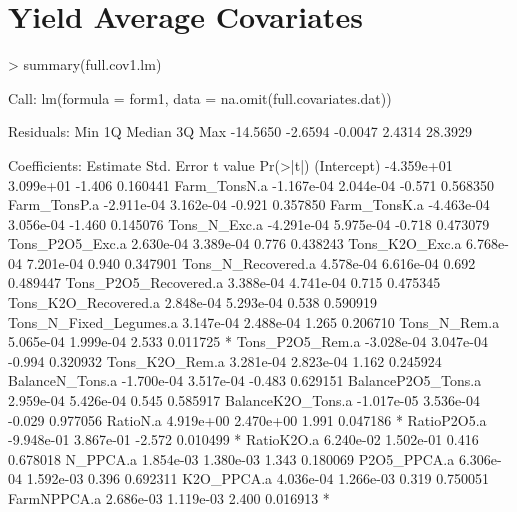 \documentclass{report}
\begin{document}
\section{Yield Average Covariates}
\begin{Schunk}
\begin{Sinput}
> summary(full.cov1.lm)
\end{Sinput}
\begin{Soutput}
Call:
lm(formula = form1, data = na.omit(full.covariates.dat))

Residuals:
     Min       1Q   Median       3Q      Max 
-14.5650  -2.6594  -0.0047   2.4314  28.3929 

Coefficients:
                                   Estimate Std. Error t value Pr(>|t|)    
(Intercept)                      -4.359e+01  3.099e+01  -1.406 0.160441    
Farm_TonsN.a                     -1.167e-04  2.044e-04  -0.571 0.568350    
Farm_TonsP.a                     -2.911e-04  3.162e-04  -0.921 0.357850    
Farm_TonsK.a                     -4.463e-04  3.056e-04  -1.460 0.145076    
Tons_N_Exc.a                     -4.291e-04  5.975e-04  -0.718 0.473079    
Tons_P2O5_Exc.a                   2.630e-04  3.389e-04   0.776 0.438243    
Tons_K2O_Exc.a                    6.768e-04  7.201e-04   0.940 0.347901    
Tons_N_Recovered.a                4.578e-04  6.616e-04   0.692 0.489447    
Tons_P2O5_Recovered.a             3.388e-04  4.741e-04   0.715 0.475345    
Tons_K2O_Recovered.a              2.848e-04  5.293e-04   0.538 0.590919    
Tons_N_Fixed_Legumes.a            3.147e-04  2.488e-04   1.265 0.206710    
Tons_N_Rem.a                      5.065e-04  1.999e-04   2.533 0.011725 *  
Tons_P2O5_Rem.a                  -3.028e-04  3.047e-04  -0.994 0.320932    
Tons_K2O_Rem.a                    3.281e-04  2.823e-04   1.162 0.245924    
BalanceN_Tons.a                  -1.700e-04  3.517e-04  -0.483 0.629151    
BalanceP2O5_Tons.a                2.959e-04  5.426e-04   0.545 0.585917    
BalanceK2O_Tons.a                -1.017e-05  3.536e-04  -0.029 0.977056    
RatioN.a                          4.919e+00  2.470e+00   1.991 0.047186 *  
RatioP2O5.a                      -9.948e-01  3.867e-01  -2.572 0.010499 *  
RatioK2O.a                        6.240e-02  1.502e-01   0.416 0.678018    
N_PPCA.a                          1.854e-03  1.380e-03   1.343 0.180069    
P2O5_PPCA.a                       6.306e-04  1.592e-03   0.396 0.692311    
K2O_PPCA.a                        4.036e-04  1.266e-03   0.319 0.750051    
FarmNPPCA.a                       2.686e-03  1.119e-03   2.400 0.016913 *  

\end{Soutput}
\end{Schunk}
\end{document}
